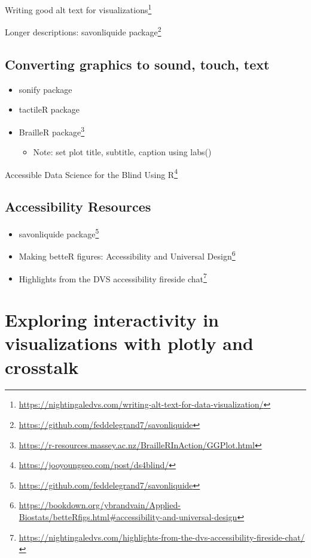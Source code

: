\documentclass[
]{krantz}
\providecommand{\tightlist}{%
  \setlength{\itemsep}{0pt}\setlength{\parskip}{0pt}}
\renewcommand{\href}[2]{#2\footnote{\url{#1}}}
\begin{document}
\href{https://nightingaledvs.com/writing-alt-text-for-data-visualization/}{Writing good alt text for visualizations}

Longer descriptions: \href{https://github.com/feddelegrand7/savonliquide}{savonliquide package}

\hypertarget{converting-graphics-to-sound-touch-text}{%
\section{Converting graphics to sound, touch, text}\label{converting-graphics-to-sound-touch-text}}

\begin{itemize}
\item
  sonify package
\item
  tactileR package
\item
  \href{https://r-resources.massey.ac.nz/BrailleRInAction/GGPlot.html}{BrailleR package}

  \begin{itemize}
  \tightlist
  \item
    Note: set plot title, subtitle, caption using labs()
  \end{itemize}
\end{itemize}

\href{https://jooyoungseo.com/post/ds4blind/}{Accessible Data Science for the Blind Using R}

\hypertarget{accessibility-resources}{%
\section{Accessibility Resources}\label{accessibility-resources}}

\begin{itemize}
\item
  \href{https://github.com/feddelegrand7/savonliquide}{savonliquide package}
\item
  \href{https://bookdown.org/ybrandvain/Applied-Biostats/betteRfigs.html\#accessibility-and-universal-design}{Making betteR figures: Accessibility and Universal Design}
\item
  \href{https://nightingaledvs.com/highlights-from-the-dvs-accessibility-fireside-chat/}{Highlights from the DVS accessibility fireside chat}
\end{itemize}

\hypertarget{interactive-visualizations}{%
\chapter{Exploring interactivity in visualizations with plotly and crosstalk}\label{interactive-visualizations}}
\end{document}
